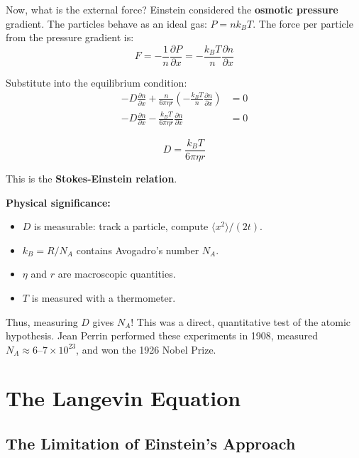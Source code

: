 \documentclass[11pt,a4paper]{article}
\begin{document}
	Now, what is the external force? Einstein considered the \textbf{osmotic pressure} gradient. The particles behave as an ideal gas: $P = n k_B T$. The force per particle from the pressure gradient is:
	\begin{equation}
		F = -\frac{1}{n} \frac{\partial P}{\partial x} = -\frac{k_B T}{n} \frac{\partial n}{\partial x}
	\end{equation}
	
	Substitute into the equilibrium condition:
	\begin{align}
		-D \frac{\partial n}{\partial x} + \frac{n}{6\pi \eta r} \left(-\frac{k_B T}{n} \frac{\partial n}{\partial x}\right) &= 0 \\
		-D \frac{\partial n}{\partial x} - \frac{k_B T}{6\pi \eta r} \frac{\partial n}{\partial x} &= 0
	\end{align}
	
	\begin{equation}
		\boxed{D = \frac{k_B T}{6\pi \eta r}}
	\end{equation}
	
	This is the \textbf{Stokes-Einstein relation}.
	
	\textbf{Physical significance:}
	\begin{itemize}
		\item $D$ is measurable: track a particle, compute $\langle x^2 \rangle / (2t)$.
		\item $k_B = R / N_A$ contains Avogadro's number $N_A$.
		\item $\eta$ and $r$ are macroscopic quantities.
		\item $T$ is measured with a thermometer.
	\end{itemize}
	
	Thus, measuring $D$ gives $N_A$! This was a direct, quantitative test of the atomic hypothesis. Jean Perrin performed these experiments in 1908, measured $N_A \approx 6\text{--}7 \times 10^{23}$, and won the 1926 Nobel Prize.
	
	\section{The Langevin Equation}
	
	\subsection{The Limitation of Einstein's Approach}
	
\end{document}
